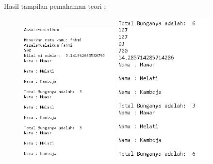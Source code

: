 Hasil tampilan pemahaman teori : 
\begin{figure}[h]
	\includegraphics[width=50mm]{figures/fahmi/5.png}
	\includegraphics[width=50mm]{figures/fahmi/6.png}
	\centering
\end{figure}


\newpage
